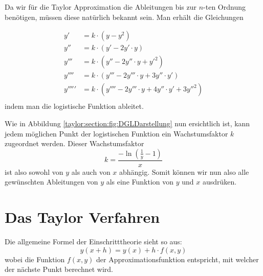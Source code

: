 Da wir für die Taylor Approximation die Ableitungen bis zur $n$-ten Ordnung benötigen, müssen diese natürlich bekannt sein. Man erhält die Gleichungen

\begin{equation}
	\begin{aligned}
		y'&=k\cdot (y-y^{2})\\
		y''&=k\cdot (y'-2y'\cdot y)\\
		y'''&=k\cdot (y''-2y''\cdot y+y'^{2})\\
		y''''&=k\cdot (y'''-2y'''\cdot y+3y''\cdot y')\\
		y'''''&=k\cdot (y''''-2y'''\cdot y+4y''\cdot y'+3y''^{2})\\
	\end{aligned}
\end{equation}
indem man die logistische Funktion ableitet.

Wie in Abbildung \ref{taylor:section:fig:DGLDarstellung} nun ersichtlich ist, kann jedem möglichen Punkt der logistischen Funktion ein Wachstumsfaktor $k$ zugeordnet werden. Dieser Wachstumsfaktor
\begin{equation}
	k=\frac{-\ln{(\frac{1}{y}-1)}}{x}
\end{equation}
ist also sowohl von $y$ als auch von $x$ abhängig.
Somit können wir nun also alle gewünschten Ableitungen von $y$ als eine Funktion von $y$ und $x$ ausdrüken.

\section{Das Taylor Verfahren}
\label{taylor:subsection:Vorgehen}
Die allgemeine Formel der Einschritttheorie sieht so aus:
\begin{equation}
y(x+h) = y(x) + h\cdot f(x,y)
\end{equation}
wobei die Funktion $f(x,y)$ der Approximationsfunktion entspricht, mit welcher der nächste Punkt berechnet wird.

